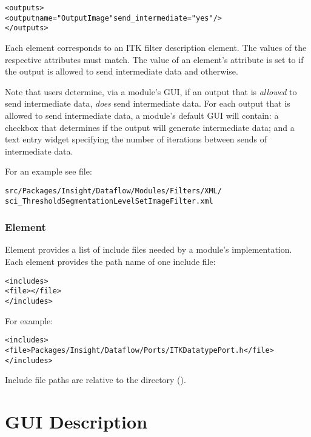 \begin{alltt}
  <outputs>
    <output name="OutputImage" send_intermediate="yes"/>
  </outputs>
\end{alltt}

Each  element corresponds to an ITK filter
description  element.  The values of the
respective  attributes must match.  The value of an
 element's 
attribute is set to  if the output is allowed to
send intermediate data and  otherwise.

Note that users determine, via a module's GUI, if an output that is
\emph{allowed} to send intermediate data, \emph{does} send
intermediate data.  For each output that is allowed to send
intermediate data, a module's default GUI will contain: a checkbox
that determines if the output will generate intermediate data; and a
text entry widget specifying the number of iterations between
sends of intermediate data.

For an example see file:

\begin{alltt}
  src/Packages/Insight/Dataflow/Modules/Filters/XML/
    sci\_ThresholdSegmentationLevelSetImageFilter.xml
\end{alltt}

\subsubsection{Element }

Element  provides a list of include files needed
by a module's implementation.  Each  element
provides the path name of one include file:

\begin{alltt}
  <includes>
    <file></file>
    \velide
  </includes>
\end{alltt}

For example:

\begin{alltt}
  <includes>
    <file>Packages/Insight/Dataflow/Ports/ITKDatatypePort.h</file>
  </includes>
\end{alltt}

Include file paths are relative to the \sr{}  directory
().

\section{\sr{} GUI Description}
\label{sec:itk_mods:sr_gui_desc}

